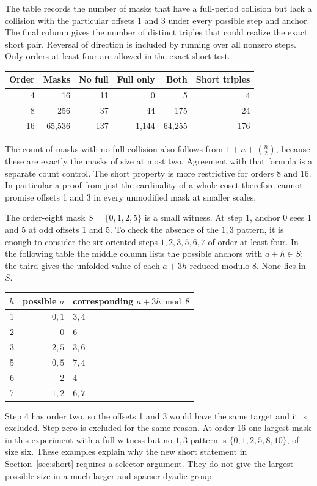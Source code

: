 \documentclass[12pt,letterpaper]{article}
\begin{document}
The table records the number of masks that have a full-period collision but lack a collision with the particular offsets 1 and 3 under every possible step and anchor. The final column gives the number of distinct triples that could realize the exact short pair. Reversal of direction is included by running over all nonzero steps. Only orders at least four are allowed in the exact short test.
\begin{center}
\begin{tabular}{@{}rrrrrr@{}}
\toprule
Order & Masks & No full & Full only & Both & Short triples\\
\midrule
4&16&11&0&5&4\\
8&256&37&44&175&24\\
16&65,536&137&1,144&64,255&176\\
\bottomrule
\end{tabular}
\end{center}
The count of masks with no full collision also follows from \(1+n+\binom n2\), because these are exactly the masks of size at most two. Agreement with that formula is a separate count control. The short property is more restrictive for orders 8 and 16. In particular a proof from just the cardinality of a whole coset therefore cannot promise offsets 1 and 3 in every unmodified mask at smaller scales.

The order-eight mask \(S=\{0,1,2,5\}\) is a small witness. At step 1, anchor 0 sees 1 and 5 at odd offsets 1 and 5. To check the absence of the \(1,3\) pattern, it is enough to consider the six oriented steps \(1,2,3,5,6,7\) of order at least four. In the following table the middle column lists the possible anchors with \(a+h\in S\); the third gives the unfolded value of each \(a+3h\) reduced modulo 8. None lies in \(S\).
\begin{center}
\begin{tabular}{@{}rrl@{}}
\toprule
\(h\) & possible \(a\) & corresponding \(a+3h\bmod8\)\\
\midrule
1 & \(0,1\) & \(3,4\)\\
2 & \(0\) & \(6\)\\
3 & \(2,5\) & \(3,6\)\\
5 & \(0,5\) & \(7,4\)\\
6 & \(2\) & \(4\)\\
7 & \(1,2\) & \(6,7\)\\
\bottomrule
\end{tabular}
\end{center}
Step 4 has order two, so the offsets 1 and 3 would have the same target and it is excluded. Step zero is excluded for the same reason. At order 16 one largest mask in this experiment with a full witness but no \(1,3\) pattern is \(\{0,1,2,5,8,10\}\), of size six. These examples explain why the new short statement in Section~\ref{sec:short} requires a selector argument. They do not give the largest possible size in a much larger and sparser dyadic group.
\end{document}
